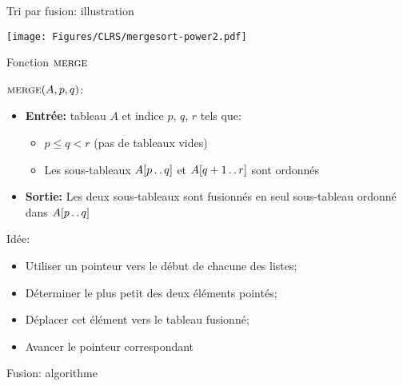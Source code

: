 \begin{frame}{Tri par fusion: illustration}

\centerline{\texttt{[image: Figures/CLRS/mergesort-power2.pdf]}}


\end{frame}

\begin{frame}{Fonction $\textnormal{\scshape merge}$}

$\textnormal{\scshape merge}(A,p,q)$:
\begin{itemize}
\item {\bf Entrée:} tableau $A$ et indice $p$, $q$, $r$ tels que:
\begin{itemize}
\item $p\leq q<r$ (pas de tableaux vides)
\item Les sous-tableaux $A[p\mathinner{\ldotp\ldotp} q]$ et $A[q+1\mathinner{\ldotp\ldotp} r]$ sont ordonnés
\end{itemize}
\item {\bf Sortie:} Les deux sous-tableaux sont fusionnés en seul sous-tableau ordonné dans $A[p\mathinner{\ldotp\ldotp} q]$
\end{itemize}

\bigskip

Idée:
\begin{itemize}
\item Utiliser un pointeur vers le début de chacune des listes;
\item Déterminer le plus petit des deux éléments pointés;
\item Déplacer cet élément vers le tableau fusionné;
\item Avancer le pointeur correspondant
\end{itemize}


\end{frame}

\begin{frame}{Fusion: algorithme}

\begin{center}\small
\end{center}

\end{frame}

